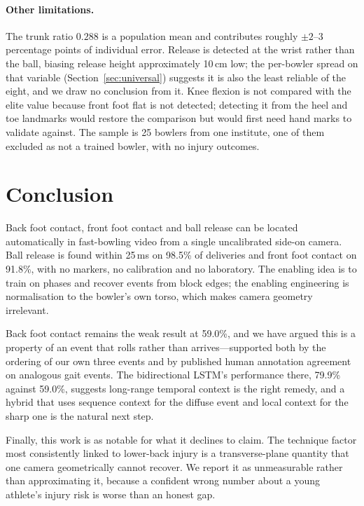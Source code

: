 \documentclass[11pt,a4paper]{article}
\begin{document}
\paragraph{Other limitations.} The trunk ratio $0.288$ is a population mean and
contributes roughly $\pm 2$--$3$ percentage points of individual error. Release
is detected at the wrist rather than the ball, biasing release height
approximately 10\,cm low; the per-bowler spread on that variable
(Section~\ref{sec:universal}) suggests it is also the least reliable of the
eight, and we draw no conclusion from it. Knee flexion is not compared with the
elite value because front foot flat is not detected; detecting it from the heel
and toe landmarks would restore the comparison but would first need hand marks
to validate against. The sample is 25 bowlers from one institute, one of
them excluded as not a trained bowler, with no injury outcomes.

\section{Conclusion}
\label{sec:conclusion}

Back foot contact, front foot contact and ball release can be located
automatically in fast-bowling video from a single uncalibrated side-on camera.
Ball release is found within 25\,ms on 98.5\% of deliveries and front foot
contact on 91.8\%, with no markers, no calibration and no laboratory. The
enabling idea is to train on phases and recover events from block edges; the
enabling engineering is normalisation to the bowler's own torso, which makes
camera geometry irrelevant.

Back foot contact remains the weak result at 59.0\%, and we have argued this is
a property of an event that rolls rather than arrives---supported both by the
ordering of our own three events and by published human annotation agreement on
analogous gait events. The bidirectional LSTM's performance there, 79.9\%
against 59.0\%, suggests long-range temporal context is the right remedy, and a
hybrid that uses sequence context for the diffuse event and local context for
the sharp one is the natural next step.

Finally, this work is as notable for what it declines to claim. The technique
factor most consistently linked to lower-back injury is a transverse-plane
quantity that one camera geometrically cannot recover. We
report it as unmeasurable rather than approximating it, because a confident
wrong number about a young athlete's injury risk is worse than an honest gap.
\end{document}
